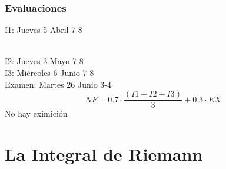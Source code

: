    \section*{Evaluaciones}
        
    {\raggedright I1: Jueves 5 Abril 7-8}\\
    I2: Jueves 3 Mayo 7-8\\
    I3: Miércoles 6 Junio 7-8\\
    Examen: Martes 26 Junio 3-4\\

    \[
        NF = 0.7\cdot\frac{(I1+I2+I3)}{3}+0.3\cdot EX
    \]
    No hay eximición 
    \tableofcontents

    \part{La Integral de Riemann}
